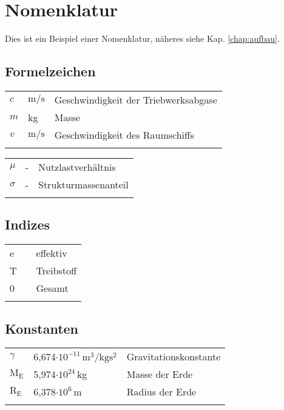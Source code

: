 \newpage
\chapter*{Nomenklatur}

Dies ist ein Beispiel einer Nomenklatur, näheres siehe Kap. \ref{chap:aufbau}.

\section*{Formelzeichen}
\begin{tabular}{lll}
  $c$            & $\mathrm{m/s}$ & Geschwindigkeit der Triebwerksabgase\\
  \vspace{1mm}
  $m$            & kg & Masse \\
  \vspace{1mm}
  $v$            & $\mathrm{m/s}$ & Geschwindigkeit des Raumschiffs\\
  \vspace{1mm}
\end{tabular}

\begin{tabular}{lll}
	$\mu$            & - & Nutzlastverhältnis \\
	\vspace{1mm}
	$\sigma$            & - & Strukturmassenanteil \\
	\vspace{1mm}
\end{tabular}

\section*{Indizes}
\begin{tabular}{lll}
	e  &  & effektiv \\
	\vspace{1mm}
	T  &  & Treibstoff \\
	\vspace{1mm}
	0  &  & Gesamt \\
	\vspace{1mm}
\end{tabular}

\section*{Konstanten}
\begin{tabular}{lll}
	$\gamma$  & 6,674$\cdot10^{-11}\,\mathrm{m^3/kgs^2}$  & Gravitationskonstante \\
	\vspace{1mm}
	$\mathrm{M_{\textrm{E}}}$  & 5,974$\cdot10^{24}\,$kg & Masse der Erde \\
	\vspace{1mm}
	$\mathrm{R_{\textrm{E}}}$  & 6,378$\cdot10^6\,$m & Radius der Erde \\
	\vspace{1mm}
\end{tabular}


